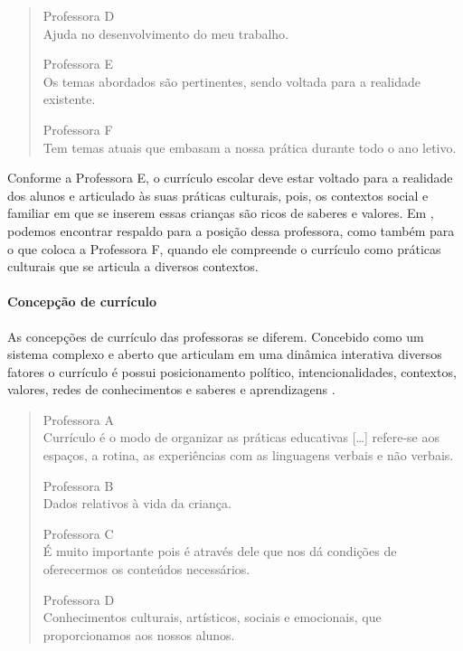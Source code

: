 \begin{refsection}
\begin{quotation}
        \negpar[-1.5em]{}Professora D\quad{}\\Ajuda no desenvolvimento do meu trabalho. 
        \medskip

        \negpar[-1.5em]{}Professora E\quad{}\\Os temas abordados são pertinentes, sendo voltada para a realidade existente. 
        \medskip

        \negpar[-1.5em]{}Professora F\quad{}\\Tem temas atuais que embasam a nossa prática durante todo o ano letivo. 
    \end{quotation}

    Conforme a Professora E, o currículo escolar deve estar voltado para a realidade dos alunos e articulado às suas práticas culturais, pois, os contextos social e familiar em que se inserem essas crianças são ricos de saberes e valores. Em \textcite{BARBOSA2009Práticas}, podemos encontrar respaldo para a posição dessa professora, como também para o que coloca a Professora F, quando ele compreende o currículo como práticas culturais que se articula a diversos contextos. 

    \paragraph{Concepção de currículo} As concepções de currículo das professoras se diferem. Concebido como um sistema complexo e aberto que articulam em uma dinâmica interativa diversos fatores o currículo é possui posicionamento político, intencionalidades, contextos, valores, redes de conhecimentos e saberes e aprendizagens \cite{CAVALCANTI2011Currículo}.  

    \begin{quotation}
        \noindent\negpar[-1.5em]{}Professora A\quad{}\\Currículo é o modo de organizar as práticas educativas [\dots] refere-se aos espaços, a rotina, as experiências com as linguagens verbais e não verbais. 
        \medskip
    
        \negpar[-1.5em]{}Professora B\quad{}\\Dados relativos à vida da criança. 
        \medskip

        \negpar[-1.5em]{}Professora C\quad{}\\É muito importante pois é através dele que nos dá condições de oferecermos os conteúdos necessários. 
        \medskip

        \negpar[-1.5em]{}Professora D\quad{}\\Conhecimentos culturais, artísticos, sociais e emocionais, que proporcionamos aos nossos alunos. 
        \medskip


\end{quotation}
\end{refsection}
